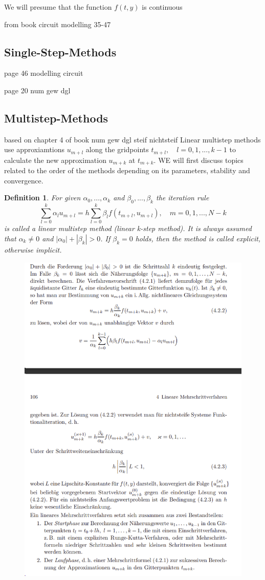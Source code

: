 \documentclass[11pt,titlepage]{article}
\newtheorem{definition}{Definition}
\begin{document}
		We will presume that the function $f(t,y)$ is continuous 
		
		
		from book circuit modelling 35-47
		
		\subsection{Single-Step-Methods}
			page 46 modelling circuit
			
			page 20 num gew dgl
		\subsection{Multistep-Methods}
			based on chapter 4 of book num gew dgl steif nichtsteif \newline
			Linear multistep methods use approxiamtions $u_{m+l}$ along the gridpoints $t_{m+l}, \quad l=0,1,...,k-1$ to calculate the new approximation $u_{m+k}$ at $t_{m+k}$. WE will first discuss topics related to the order of the methods depending on its parameters, stability and convergence.
			
			\begin{definition}
				For given $\alpha_0, ..., \alpha_k$ and $\beta_0, ..., \beta_k$ the iteration rule
				\begin{equation}
					\label{linear-multistep-method}
					\sum_{l=0}^{k} \alpha_l u_{m+l} = h \sum_{l=0}^{k} \beta_l f(t_{m+l}, u_{m+l}), \quad m=0,1,...,N-k
				\end{equation}
				is called a \emph{linear multistep method} (linear k-step method). It is always assumed that $\alpha_k \neq 0$ and $|\alpha_0| + |\beta_k| > 0$. If $\beta_k=0$ holds, then the method is called explicit, otherwise implicit.
			\end{definition}
			
			\begin{figure}[H]
				\centering
				\includegraphics[width=0.7\linewidth]{screenshot010}
				\caption{}
				\label{fig:screenshot010}
			\end{figure}
		
\end{document}
